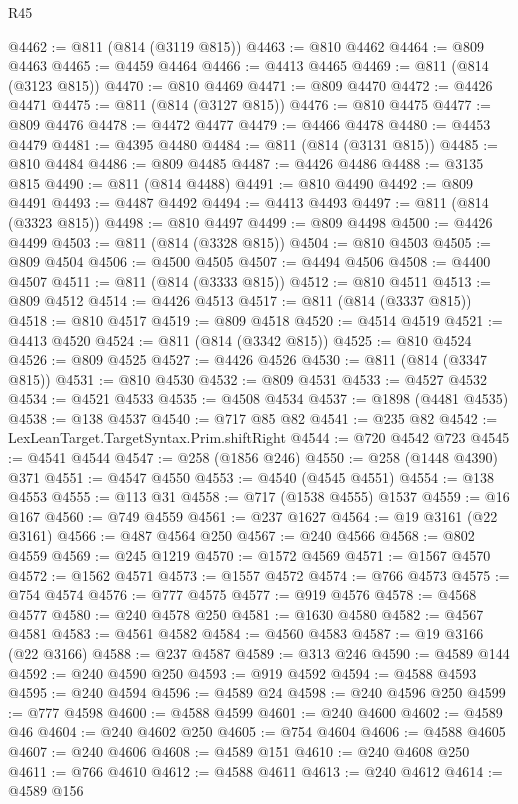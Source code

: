 \begin{lexlean}{R45}
\begin{coremodule}
{@4462 := @811 (@814 (@3119 @815))
@4463 := @810 @4462
@4464 := @809 @4463
@4465 := @4459 @4464
@4466 := @4413 @4465
@4469 := @811 (@814 (@3123 @815))
@4470 := @810 @4469
@4471 := @809 @4470
@4472 := @4426 @4471
@4475 := @811 (@814 (@3127 @815))
@4476 := @810 @4475
@4477 := @809 @4476
@4478 := @4472 @4477
@4479 := @4466 @4478
@4480 := @4453 @4479
@4481 := @4395 @4480
@4484 := @811 (@814 (@3131 @815))
@4485 := @810 @4484
@4486 := @809 @4485
@4487 := @4426 @4486
@4488 := @3135 @815
@4490 := @811 (@814 @4488)
@4491 := @810 @4490
@4492 := @809 @4491
@4493 := @4487 @4492
@4494 := @4413 @4493
@4497 := @811 (@814 (@3323 @815))
@4498 := @810 @4497
@4499 := @809 @4498
@4500 := @4426 @4499
@4503 := @811 (@814 (@3328 @815))
@4504 := @810 @4503
@4505 := @809 @4504
@4506 := @4500 @4505
@4507 := @4494 @4506
@4508 := @4400 @4507
@4511 := @811 (@814 (@3333 @815))
@4512 := @810 @4511
@4513 := @809 @4512
@4514 := @4426 @4513
@4517 := @811 (@814 (@3337 @815))
@4518 := @810 @4517
@4519 := @809 @4518
@4520 := @4514 @4519
@4521 := @4413 @4520
@4524 := @811 (@814 (@3342 @815))
@4525 := @810 @4524
@4526 := @809 @4525
@4527 := @4426 @4526
@4530 := @811 (@814 (@3347 @815))
@4531 := @810 @4530
@4532 := @809 @4531
@4533 := @4527 @4532
@4534 := @4521 @4533
@4535 := @4508 @4534
@4537 := @1898 (@4481 @4535)
@4538 := @138 @4537
@4540 := @717 @85 @82
@4541 := @235 @82
@4542 := LexLeanTarget.TargetSyntax.Prim.shiftRight
@4544 := @720 @4542 @723
@4545 := @4541 @4544
@4547 := @258 (@1856 @246)
@4550 := @258 (@1448 @4390) @371
@4551 := @4547 @4550
@4553 := @4540 (@4545 @4551)
@4554 := @138 @4553
@4555 := @113 @31
@4558 := @717 (@1538 @4555) @1537
@4559 := @16 @167
@4560 := @749 @4559
@4561 := @237 @1627
@4564 := @19 @3161 (@22 @3161)
@4566 := @487 @4564 @250
@4567 := @240 @4566
@4568 := @802 @4559
@4569 := @245 @1219
@4570 := @1572 @4569
@4571 := @1567 @4570
@4572 := @1562 @4571
@4573 := @1557 @4572
@4574 := @766 @4573
@4575 := @754 @4574
@4576 := @777 @4575
@4577 := @919 @4576
@4578 := @4568 @4577
@4580 := @240 @4578 @250
@4581 := @1630 @4580
@4582 := @4567 @4581
@4583 := @4561 @4582
@4584 := @4560 @4583
@4587 := @19 @3166 (@22 @3166)
@4588 := @237 @4587
@4589 := @313 @246
@4590 := @4589 @144
@4592 := @240 @4590 @250
@4593 := @919 @4592
@4594 := @4588 @4593
@4595 := @240 @4594
@4596 := @4589 @24
@4598 := @240 @4596 @250
@4599 := @777 @4598
@4600 := @4588 @4599
@4601 := @240 @4600
@4602 := @4589 @46
@4604 := @240 @4602 @250
@4605 := @754 @4604
@4606 := @4588 @4605
@4607 := @240 @4606
@4608 := @4589 @151
@4610 := @240 @4608 @250
@4611 := @766 @4610
@4612 := @4588 @4611
@4613 := @240 @4612
@4614 := @4589 @156
}
\end{coremodule}
\end{lexlean}
